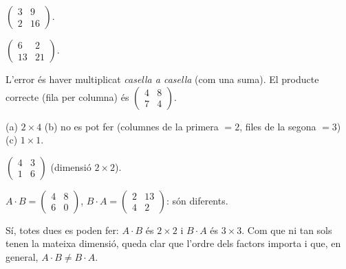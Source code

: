 \begin{solucions}
\begin{sollist}
  \item $\begin{pmatrix} 3 & 9 \\ 2 & 16 \end{pmatrix}$.
  \item $\begin{pmatrix} 6 & 2 \\ 13 & 21 \end{pmatrix}$.
  \item L'error és haver multiplicat \emph{casella a casella} (com una suma). El
        producte correcte (fila per columna) és
        $\begin{pmatrix} 4 & 8 \\ 7 & 4 \end{pmatrix}$.
  \item (a) $2\times 4$ \quad (b) no es pot fer (columnes de la primera $=2$, files
        de la segona $=3$) \quad (c) $1\times 1$.
  \item $\begin{pmatrix} 4 & 3 \\ 1 & 6 \end{pmatrix}$ (dimensió $2\times 2$).
  \item $A\cdot B=\begin{pmatrix} 4 & 8 \\ 6 & 0 \end{pmatrix}$,
        \;$B\cdot A=\begin{pmatrix} 2 & 13 \\ 4 & 2 \end{pmatrix}$: són diferents.
  \item Sí, totes dues es poden fer: $A\cdot B$ és $2\times 2$ i $B\cdot A$ és
        $3\times 3$. Com que ni tan sols tenen la mateixa dimensió, queda clar que
        l'ordre dels factors importa i que, en general, $A\cdot B\neq B\cdot A$.
\end{sollist}
\end{solucions}
